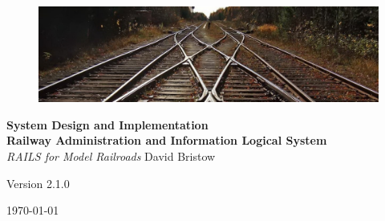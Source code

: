 \documentclass[letterpaper, oneside, 11pt]{book}
\begin{document}
\begin{titlepage}
	\raggedleft
	\begin{figure}[H]
	\centering
		\includegraphics[scale=1.53]{../Images/railway_track.jpg}
	\label{fig:track}
\end{figure}
	\vspace*{0.167\textheight}
	\textbf{\LARGE System Design and Implementation}\\[\baselineskip]
    \textbf{\textcolor{MyBlue}{\Huge R\Large ailway \Huge A\Large dministration and \Huge I\Large nformation \Huge L\Large ogical \Huge S\Large ystem}}\\[\baselineskip]
	{\Large \textit{RAILS for Model Railroads}}
	\vfill
    \vspace*{\baselineskip}
	{\small David Bristow}

	{\small Version 2.1.0}
	
	{\small \today}
	\vspace*{3\baselineskip}
\end{titlepage}
\tableofcontents






\backmatter

\printnoidxglossary[sort=letter]
\end{document}
